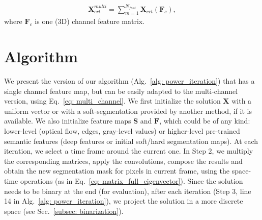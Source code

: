 \documentclass{article}
\begin{document}
\begin{equation}
\label{eq: multi_channel}
    \begin{aligned}
        \mathbf{X}_{crt}^{multi} = \sum_{m = 1}^{N_{feat}} \mathbf{X}_{crt} (\mathbf{F}_{c}),
    \end{aligned}
\end{equation}
where $\mathbf{F}_{c}$ is one (3D) channel feature matrix.

\section{Algorithm}
\label{sec: algorithm}
We present the version of our algorithm (Alg.~\ref{alg: power_iteration}) that has a single channel feature map, but can be easily adapted to the multi-channel version, using Eq.~\ref{eq: multi_channel}. We first initialize the solution $\mathbf{X}$ with a uniform vector or with a soft-segmentation provided by another method, if it is available. We also initialize feature maps
$\mathbf{S}$ and $\mathbf{F}$, which could be of any kind: lower-level (optical flow, edges, gray-level values) or higher-level pre-trained semantic features (deep features or initial soft/hard segmentation maps). 
At each iteration, we select a time frame around the current one. In Step 2, we multiply the corresponding matrices, apply the convolutions, compose the results and obtain the new segmentation mask for pixels in current frame, using the space-time operations (as in Eq.~\ref{eq: matrix_full_eigenvector}). Since the solution needs to be binary at the end (for evaluation), after each iteration (Step 3, line 14 in Alg.~\ref{alg: power_iteration}), we project the solution in a more discrete space (see Sec.~\ref{subsec: binarization}). 
\end{document}
